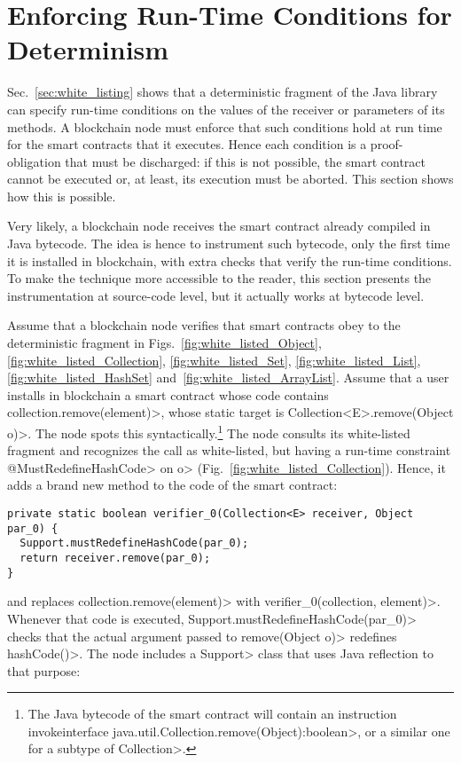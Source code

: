 \section{Enforcing Run-Time Conditions for Determinism}\label{sec:enforcing}

Sec.~\ref{sec:white_listing} shows that a deterministic fragment of the Java library
can specify run-time conditions on the values of the receiver or
parameters of its methods. A blockchain node must enforce that such conditions hold
at run time for the smart contracts that it executes. Hence each condition
is a proof-obligation that must be discharged: if this is not possible, the smart contract
cannot be executed or, at least, its execution must be aborted. This section shows how
this is possible.

Very likely, a blockchain node receives the smart contract already compiled in Java bytecode.
The idea is hence to instrument such bytecode, only the first time it is installed in blockchain,
with extra checks that verify the run-time conditions.
To make the technique more accessible to the reader, this section presents
the instrumentation at source-code level, but it actually works at bytecode level.

Assume that a blockchain node verifies that smart contracts obey to the deterministic
fragment in Figs.~\ref{fig:white_listed_Object}, \ref{fig:white_listed_Collection},
\ref{fig:white_listed_Set}, \ref{fig:white_listed_List},
\ref{fig:white_listed_HashSet} and~\ref{fig:white_listed_ArrayList}.
Assume that a user installs in blockchain a smart contract whose
code contains \<collection.remove(element)>, whose static target is
\<Collection$\text{<}$E$\text{>}$.remove(Object o)>.
The node spots this syntactically.\footnote{The Java bytecode of the
  smart contract will
  contain an instruction \<invokeinterface java.util.Collection.remove(Object):boolean>,
  or a similar one for a subtype of \<Collection>.}
The node consults its white-listed fragment and recognizes the call as
white-listed, but having a run-time constraint \<@MustRedefineHashCode> on \<o>
(Fig.~\ref{fig:white_listed_Collection}). Hence, it
adds a brand new method to the code of the smart contract:

{\small\begin{verbatim}
private static boolean verifier_0(Collection<E> receiver, Object par_0) {
  Support.mustRedefineHashCode(par_0);
  return receiver.remove(par_0);
}
\end{verbatim}}

\noindent
and replaces \<collection.remove(element)> with \<verifier\_0(collection, element)>.
Whenever that code is executed,
\<Support.mustRedefineHashCode(par\_0)> checks that the actual argument
passed to \<remove(Object o)> redefines \<hashCode()>. The node includes a
\<Support> class that uses Java reflection to that purpose:

